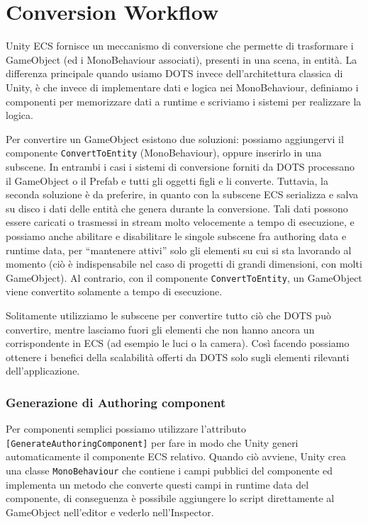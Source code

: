 \section{Conversion Workflow}
Unity ECS fornisce un meccanismo di conversione che permette di trasformare i GameObject (ed i MonoBehaviour associati), presenti in una scena, in entità. La differenza principale quando usiamo DOTS invece dell'architettura classica di Unity, è che invece di implementare dati e logica nei MonoBehaviour, definiamo i componenti per memorizzare dati a runtime e scriviamo i sistemi per realizzare la logica.

Per convertire un GameObject esistono due soluzioni: possiamo aggiungervi il componente \verb|ConvertToEntity| (MonoBehaviour), oppure inserirlo in una subscene. In entrambi i casi i sistemi di conversione forniti da DOTS processano il GameObject o il Prefab e tutti gli oggetti figli e li converte.
Tuttavia, la seconda soluzione è da preferire, in quanto con la subscene ECS serializza e salva su disco i dati delle entità che genera durante la conversione. Tali dati possono essere caricati o trasmessi in stream molto velocemente a tempo di esecuzione, e possiamo anche abilitare e disabilitare le singole subscene fra authoring data e runtime data, per ``mantenere attivi'' solo gli elementi su cui si sta lavorando al momento (ciò è indispensabile nel caso di progetti di grandi dimensioni, con molti GameObject). Al contrario, con il componente \verb|ConvertToEntity|, un GameObject viene convertito solamente a tempo di esecuzione.

Solitamente utilizziamo le subscene per convertire tutto ciò che DOTS può convertire, mentre lasciamo fuori gli elementi che non hanno ancora un corrispondente in ECS (ad esempio le luci o la camera). Così facendo possiamo ottenere i benefici della scalabilità offerti da DOTS solo sugli elementi rilevanti dell'applicazione.

\subsubsection{Generazione di Authoring component}
Per componenti semplici possiamo utilizzare l'attributo \verb|[GenerateAuthoringComponent]| per fare in modo che Unity generi automaticamente il componente ECS relativo. Quando ciò avviene, Unity crea una classe \verb|MonoBehaviour| che contiene i campi pubblici del componente ed implementa un metodo che converte questi campi in runtime data del componente, di conseguenza è possibile aggiungere lo script direttamente al GameObject nell'editor e vederlo nell'Inspector.

